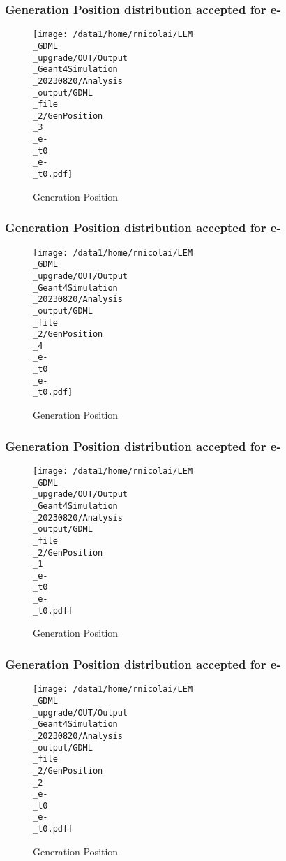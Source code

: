 \documentclass[8pt]{beamer}
\begin{document}
            \begin{frame}
                \frametitle{Generation Position distribution accepted for e-}
            
        \begin{figure}[h]
            \centering
            \texttt{[image: /data1/home/rnicolai/LEM\\\_GDML\\\_upgrade/OUT/Output\\\_Geant4Simulation\\\_20230820/Analysis\\\_output/GDML\\\_file\\\_2/GenPosition\\\_3\\\_e-\\\_t0\\\_e-\\\_t0.pdf]}
            \caption{Generation Position}
        \end{figure}
        
            \end{frame}
            
            \begin{frame}
                \frametitle{Generation Position distribution accepted for e-}
            
        \begin{figure}[h]
            \centering
            \texttt{[image: /data1/home/rnicolai/LEM\\\_GDML\\\_upgrade/OUT/Output\\\_Geant4Simulation\\\_20230820/Analysis\\\_output/GDML\\\_file\\\_2/GenPosition\\\_4\\\_e-\\\_t0\\\_e-\\\_t0.pdf]}
            \caption{Generation Position}
        \end{figure}
        
            \end{frame}
            
            \begin{frame}
                \frametitle{Generation Position distribution accepted for e-}
            
        \begin{figure}[h]
            \centering
            \texttt{[image: /data1/home/rnicolai/LEM\\\_GDML\\\_upgrade/OUT/Output\\\_Geant4Simulation\\\_20230820/Analysis\\\_output/GDML\\\_file\\\_2/GenPosition\\\_1\\\_e-\\\_t0\\\_e-\\\_t0.pdf]}
            \caption{Generation Position}
        \end{figure}
        
            \end{frame}
            
            \begin{frame}
                \frametitle{Generation Position distribution accepted for e-}
            
        \begin{figure}[h]
            \centering
            \texttt{[image: /data1/home/rnicolai/LEM\\\_GDML\\\_upgrade/OUT/Output\\\_Geant4Simulation\\\_20230820/Analysis\\\_output/GDML\\\_file\\\_2/GenPosition\\\_2\\\_e-\\\_t0\\\_e-\\\_t0.pdf]}
            \caption{Generation Position}
        \end{figure}
        
            \end{frame}
            
\end{document}
